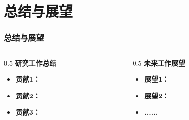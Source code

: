 \section{总结与展望}

\begin{frame}
\frametitle{总结与展望}
\begin{columns}[T] %
    \begin{column}{0.5\textwidth}
        \textbf{研究工作总结}
        \begin{itemize}
            \item \textbf{贡献1：}
            \item \textbf{贡献2：}
            \item \textbf{贡献3：}
        \end{itemize}
    \end{column}
    \begin{column}{0.5\textwidth}
        \textbf{未来工作展望}
        \begin{itemize}
            \item \textbf{展望1：}
            \item \textbf{展望2：}
            \item \textbf{......}
        \end{itemize}
    \end{column}
\end{columns}
\end{frame}
